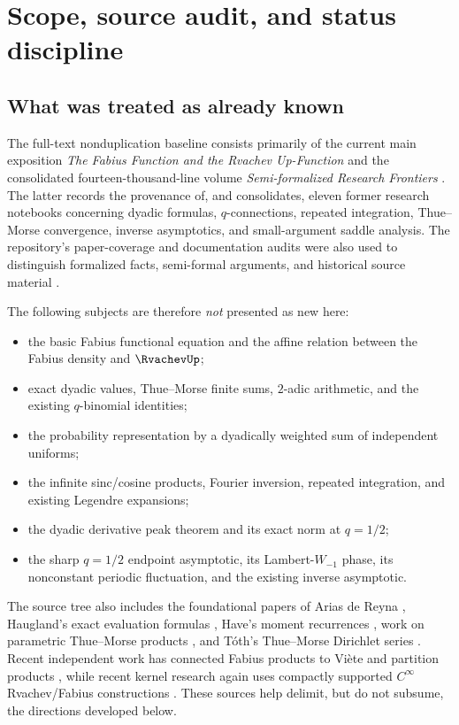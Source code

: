 \documentclass[11pt,oneside]{article}
\theoremstyle{definition}
\theoremstyle{remark}
\begin{document}
\tableofcontents
\newpage

\section{Scope, source audit, and status discipline}

\subsection{What was treated as already known}

The full-text nonduplication baseline consists primarily of the current main exposition
\emph{The Fabius Function and the Rvachev Up-Function} \cite{repo-main} and the consolidated fourteen-thousand-line volume \emph{Semi-formalized Research Frontiers} \cite{repo-frontier}.  The latter records the provenance of, and consolidates, eleven former research notebooks concerning dyadic formulas, $q$-connections, repeated integration, Thue--Morse convergence, inverse asymptotics, and small-argument saddle analysis.  The repository's paper-coverage and documentation audits were also used to distinguish formalized facts, semi-formal arguments, and historical source material \cite{repo-paper-coverage,repo-asymptotic-audit,repo-doc-audit}.

The following subjects are therefore
\emph{not} presented as new here:
\begin{itemize}
  \item the basic Fabius functional equation and the affine relation between the Fabius density and $\RvachevUp$;
  \item exact dyadic values, Thue--Morse finite sums, $2$-adic arithmetic, and the existing $q$-binomial identities;
  \item the probability representation by a dyadically weighted sum of independent uniforms;
  \item the infinite sinc/cosine products, Fourier inversion, repeated integration, and existing Legendre expansions;
  \item the dyadic derivative peak theorem and its exact norm at $q=1/2$;
  \item the sharp $q=1/2$ endpoint asymptotic, its Lambert-$W_{-1}$ phase, its nonconstant periodic fluctuation, and the existing inverse asymptotic.
\end{itemize}

The source tree also includes the foundational papers of Arias de Reyna \cite{arias-up,arias-arithmetic}, Haugland's exact evaluation formulas \cite{haugland}, Have's moment recurrences \cite{have}, work on parametric Thue--Morse products \cite{aistleitner}, and T\'oth's Thue--Morse Dirichlet series \cite{toth}.  Recent independent work has connected Fabius products to Vi\`ete and partition products \cite{sebbar}, while recent kernel research again uses compactly supported $C^\infty$ Rvachev/Fabius constructions \cite{schaback}.  These sources help delimit, but do not subsume, the directions developed below.
\end{document}
